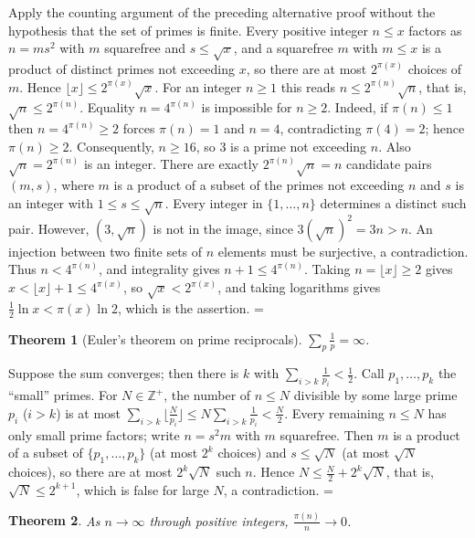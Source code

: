 \documentclass[11pt]{article}
\makeatletter
\theoremstyle{ntstyle}
\newtheorem{theorem}{Theorem}[subsection]
\let\nt@closedisplay\]
\def\nt@guardedclose{\@ifnextchar\par{\nt@closeafterpar}{\@ifnextchar\end{\postdisplaypenalty\@M\nt@closedisplay}{\nt@closedisplay}}}
\def\nt@closeafterpar\par{\@ifnextchar\par{\nt@closeafterpar}{\@ifnextchar\end{\postdisplaypenalty\@M\nt@closedisplay\par}{\nt@closedisplay\par}}}
\renewenvironment{proof}[1][\proofname]{\par
  \pushQED{\qed}\normalfont\topsep\medskipamount\edef\nt@afterproof{\@endparpenalty=\the\@endparpenalty\relax}\@beginparpenalty\@M\@endparpenalty\@M\let\]\nt@guardedclose\trivlist\item[]\textit{#1\@addpunct{.}} \ignorespaces}{\ifvmode\addpenalty\@M\fi\popQED\nt@afterproof\endtrivlist\@endpefalse}
\makeatother
\begin{document}
\begin{proof} Apply the counting argument of the preceding
	alternative proof without the hypothesis that the set of primes is finite.
	Every positive integer $n\le x$ factors as $n=ms^{2}$ with $m$ squarefree and
	$s\le\sqrt{x}$, and a squarefree $m$ with $m \le x$ is a product of distinct
	primes not exceeding $x$, so there are at most $2^{\pi(x)}$ choices of $m$.
	Hence $\lfloor x\rfloor\le 2^{\pi(x)}\sqrt{x}$. For an integer $n\ge1$ this
	reads $n\le 2^{\pi(n)}\sqrt{n}$, that is, $\sqrt{n}\le 2^{\pi(n)}$. Equality $n=4^{\pi(n)}$ is impossible for $n\ge2$.
	Indeed, if $\pi(n)\le1$ then $n=4^{\pi(n)}\ge2$ forces $\pi(n)=1$ and $n=4$, contradicting
	$\pi(4)=2$; hence $\pi(n)\ge2$.
	Consequently, $n\ge16$, so $3$ is a prime not exceeding $n$.
	Also $\sqrt n=2^{\pi(n)}$ is an integer. There are exactly
	$2^{\pi(n)}\sqrt n=n$ candidate pairs $(m,s)$, where $m$ is
	a product of a subset of the primes not exceeding $n$ and
	$s$ is an integer with $1\le s\le\sqrt n$.
	Every integer in $\{1,\ldots,n\}$ determines a distinct such pair.
	However, $(3,\sqrt n)$ is not in the image, since
	$3(\sqrt n)^2=3n>n$. An injection between two finite sets of
	$n$ elements must be surjective, a contradiction.
	Thus $n<4^{\pi(n)}$, and integrality gives $n+1\le4^{\pi(n)}$. Taking
	$n=\lfloor x\rfloor\ge2$ gives $x<\lfloor x\rfloor+1\le 4^{\pi(x)}$, so
	$\sqrt{x}<2^{\pi(x)}$, and taking logarithms gives
	$\tfrac12\ln x<\pi(x)\ln 2$, which is the assertion.
\end{proof}
\begin{theorem}[Euler's theorem on prime reciprocals]\label{thm:9.6.2} $\sum_{p} \tfrac{1}{p} = \infty$.
\end{theorem}

\begin{proof} Suppose the sum converges; then there is
	$k$ with $\sum_{i>k}\tfrac{1}{p_i} < \tfrac{1}{2}$. Call $p_1,\ldots,p_k$
	the ``small'' primes. For $N \in \mathbb{Z}^+$, the number of $n \le N$
	divisible by some large prime $p_i$ ($i>k$) is at most
	$\sum_{i>k}\big\lfloor \tfrac{N}{p_i}\big\rfloor \le
		N\sum_{i>k}\tfrac{1}{p_i} < \tfrac{N}{2}$. Every remaining $n \le N$
	has only small prime factors; write $n = s^2 m$ with $m$
	squarefree. Then $m$ is a product of a subset of $\{p_1,\ldots,p_k\}$ (at
	most $2^k$ choices) and $s \le \sqrt{N}$ (at most $\sqrt{N}$ choices),
	so there are at most $2^k\sqrt{N}$ such $n$. Hence $N \le \tfrac{N}{2}
		+ 2^k\sqrt{N}$, that is, $\sqrt{N} \le 2^{k+1}$, which is false for large $N$, a
	contradiction.
\end{proof}
\begin{theorem}\label{thm:9.6.3}
	As $n\to\infty$ through positive integers, $\tfrac{\pi(n)}{n}\to0$.
\end{theorem}
\end{document}
